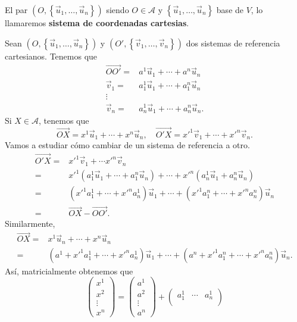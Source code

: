 \begin{fdefinition}
	\normalfont El par $\displaystyle \left(O, \left\{ \vec{u}_{1}, \ldots, \vec{u}_{n}\right\} \right) $ siendo $\displaystyle O \in \mathcal{A} $ y $\displaystyle \left\{ \vec{u}_{1}, \ldots, \vec{u}_{n}\right\}  $ base de $\displaystyle V $, lo llamaremos \textbf{sistema de coordenadas cartesias}. 
\end{fdefinition}
\begin{observation}
\normalfont Sean $\displaystyle \left(O, \left\{ \vec{u}_{1}, \ldots, \vec{u}_{n}\right\} \right) $ y $\displaystyle \left(O', \left\{ \vec{v}_{1}, \ldots, \vec{v}_{n}\right\} \right) $ dos sistemas de referencia cartesianos. Tenemos que 
\[
\begin{split}
	\overrightarrow{O O '} = & a^{1}\vec{u}_{1} + \cdots + a^{n}\vec{u}_{n} \\
	\vec{v}_{1} = & a^{1}_{1}\vec{u}_{1} + \cdots + a^{n}_{1}\vec{u}_{n} \\
	\vdots & \\
	\vec{v}_{n} = & a^{1}_{n}\vec{u}_{1} + \cdots + a^{n}_{n}\vec{u}_{n}	.
\end{split}
\]
Si $\displaystyle X \in \mathcal{A} $, tenemos que 
\[\overrightarrow{OX} = x^{1}\vec{u}_{1} + \cdots + x^{n}\vec{u}_{n}, \quad \overrightarrow{O'X}=x'^{1}\vec{v}_{1} + \cdots + x'^{n}\vec{v}_{n} .\]
Vamos a estudiar cómo cambiar de un sistema de referencia a otro. 
\[
\begin{split}
	\overrightarrow{O'X} = & x'^{1}\vec{v}_{1} + \cdots x'^{n}\vec{v}_{n} \\
	= & x'^{1}\left(a^{1}_{1}\vec{u}_{1} + \cdots + a^{n}_{1}\vec{u}_{n}\right) + \cdots + x'^{n}\left(a^{1}_{n} \vec{u}_{1} + a^{n}_{n}\vec{u}_{n}\right) \\
	= & \left(x'^{1}a^{1}_{1} + \cdots + x'^{n}a^{1}_{n}\right)\vec{u}_{1} + \cdots + \left(x'^{1}a^{n}_{1} + \cdots + x'^{n}a^{n}_{n}\right)\vec{u}_{n} \\
	= & \overrightarrow{OX}-\overrightarrow{O O'}.
\end{split}
\]
Similarmente,
\[
\begin{split}
	\overrightarrow{OX} = & x^{1}\vec{u}_{n} + \cdots + x^{n}\vec{u}_{n} \\
	= & \left(a^{1} + x'^{1}a^{1}_{1} + \cdots + x'^{n}a_{n}^{1}\right)\vec{u}_{1} + \cdots + \left(a^{n} + x'^{1}a_{1}^{n} + \cdots + x'^{n}a^{n}_{n}\right)\vec{u}_{n} .
\end{split}
\]
Así, matricialmente obtenemos que
\[\begin{pmatrix} x^{1} \\ x^{2} \\ \vdots \\ x^{n} \end{pmatrix} = \begin{pmatrix} a^{1} \\ a^{2} \\ \vdots \\ a^{n} \end{pmatrix} + \begin{pmatrix} a^{1}_{1} & \cdots & a^{1}_{n} \\

\end{pmatrix}\]
\end{observation}

